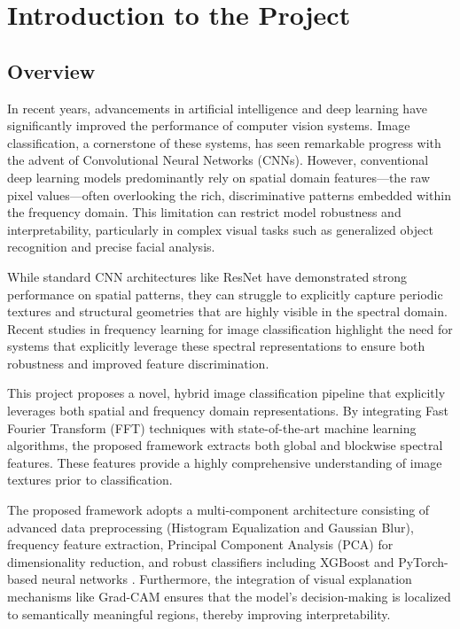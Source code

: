 \chapter{Introduction to the Project}

\section{Overview}

In recent years, advancements in artificial intelligence and deep learning have significantly improved the performance of computer vision systems. Image classification, a cornerstone of these systems, has seen remarkable progress with the advent of Convolutional Neural Networks (CNNs). However, conventional deep learning models predominantly rely on spatial domain features—the raw pixel values—often overlooking the rich, discriminative patterns embedded within the frequency domain. This limitation can restrict model robustness and interpretability, particularly in complex visual tasks such as generalized object recognition and precise facial analysis.

While standard CNN architectures like ResNet \cite{resnet} have demonstrated strong performance on spatial patterns, they can struggle to explicitly capture periodic textures and structural geometries that are highly visible in the spectral domain. Recent studies in frequency learning for image classification \cite{freq_learning} highlight the need for systems that explicitly leverage these spectral representations to ensure both robustness and improved feature discrimination.

This project proposes a novel, hybrid image classification pipeline that explicitly leverages both spatial and frequency domain representations. By integrating Fast Fourier Transform (FFT) techniques \cite{fft} with state-of-the-art machine learning algorithms, the proposed framework extracts both global and blockwise spectral features. These features provide a highly comprehensive understanding of image textures prior to classification.

The proposed framework adopts a multi-component architecture consisting of advanced data preprocessing (Histogram Equalization and Gaussian Blur), frequency feature extraction, Principal Component Analysis (PCA) \cite{pca} for dimensionality reduction, and robust classifiers including XGBoost \cite{xgboost} and PyTorch-based neural networks \cite{pytorch}. Furthermore, the integration of visual explanation mechanisms like Grad-CAM \cite{gradcam} ensures that the model's decision-making is localized to semantically meaningful regions, thereby improving interpretability.

